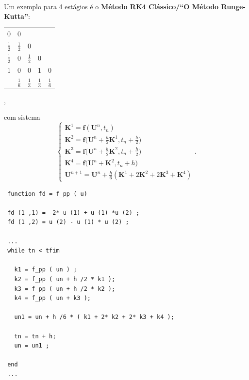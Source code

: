 \documentclass[../differential_methods.tex]{subfiles}
\begin{document}
\begin{example}
	Um exemplo para 4 estágios é o \textbf{Método RK4 Clássico/``O Método Runge-Kutta''}:
	\begin{table}[H]
		\centering
		\begin{tabular}{c | c c c c}
			0               & 0               &                 &                 &                 \\
			\(\frac{1}{2}\) & \(\frac{1}{2}\) & 0               &                 &                 \\
			\(\frac{1}{2}\) & 0               & \(\frac{1}{2}\) & 0               &                 \\
			1               & 0               & 0               & 1               & 0               \\
			\hline
			                & \(\frac{1}{6}\) & \(\frac{1}{3}\) & \(\frac{1}{3}\) & \(\frac{1}{6}\)
		\end{tabular},
	\end{table}
	com sistema
	\[
		\left\{\begin{array}{ll}
			\mathbf{K}^{1} = \mathbf{f}(\mathbf{U}^{n}, t_{n})                                                    \\
			\mathbf{K}^{2} = \mathbf{f}\bigl(\mathbf{U}^{n} + \frac{h}{2}\mathbf{K}^{1}, t_{n}+ \frac{h}{2}\bigr) \\
			\mathbf{K}^{3} = \mathbf{f}\bigl(\mathbf{U}^{n} + \frac{h}{2}\mathbf{K}^{2}, t_{n}+ \frac{h}{2}\bigr) \\
			\mathbf{K}^{4} = \mathbf{f}\bigl(\mathbf{U}^{n} + \mathbf{K}^{2}, t_{n}+ h\bigr)                      \\
			\mathbf{U}^{n+1} = \mathbf{U}^{n} + \frac{h}{6} (\mathbf{K}^{1} + 2\mathbf{K}^{2} + 2 \mathbf{K}^{3} + \mathbf{K}^{4})
		\end{array}\right..
	\]

	\begin{listing}[H]
		\caption{Implementação do RK4 para Presa-Predador}
		\begin{verbatim}
 function fd = f_pp ( u)

 fd (1 ,1) = -2* u (1) + u (1) *u (2) ;
 fd (1 ,2) = u (2) - u (1) * u (2) ;

 ...
 while tn < tfim

   k1 = f_pp ( un ) ;
   k2 = f_pp ( un + h /2 * k1 );
   k3 = f_pp ( un + h /2 * k2 );
   k4 = f_pp ( un + k3 );
  
   un1 = un + h /6 * ( k1 + 2* k2 + 2* k3 + k4 );
  
   tn = tn + h;
   un = un1 ;

 end
 ...
 \end{verbatim}
	\end{listing}
\end{example}
\end{document}
